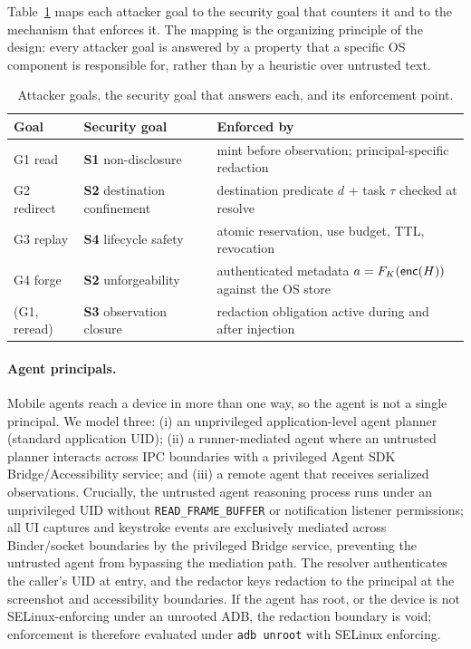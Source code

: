 Table~\ref{tab:goals} maps each attacker goal to the security goal that counters it and to the mechanism that enforces it. The mapping is the organizing principle of the design: every attacker goal is answered by a property that a specific OS component is responsible for, rather than by a heuristic over untrusted text.

\begin{table}[t]
\centering
\caption{Attacker goals, the security goal that answers each, and its enforcement point.}
\label{tab:goals}
\footnotesize
\renewcommand{\arraystretch}{1.08}
\begin{tabularx}{\columnwidth}{@{}>{\raggedright\arraybackslash}p{1.35cm}>{\raggedright\arraybackslash}p{2.15cm}>{\raggedright\arraybackslash}X@{}}
\toprule
Goal & Security goal & Enforced by \\
\midrule
G1 read & \textbf{S1} non-disclosure & mint before observation; principal-specific redaction \\
G2 redirect & \textbf{S2} destination confinement & destination predicate $d$ + task $\tau$ checked at resolve \\
G3 replay & \textbf{S4} lifecycle safety & atomic reservation, use budget, TTL, revocation \\
G4 forge & \textbf{S2} unforgeability & authenticated metadata $a=F_K(\mathsf{enc}(H))$ against the OS store \\
(G1, reread) & \textbf{S3} observation closure & redaction obligation active during and after injection \\
\bottomrule
\end{tabularx}
\end{table}

\paragraph{Agent principals.} Mobile agents reach a device in more than one way, so the agent is not a single principal. We model three: (i) an unprivileged application-level agent planner (standard application UID); (ii) a runner-mediated agent where an untrusted planner interacts across IPC boundaries with a privileged Agent SDK Bridge/Accessibility service; and (iii) a remote agent that receives serialized observations. Crucially, the untrusted agent reasoning process runs under an unprivileged UID without \texttt{READ\_FRAME\_BUFFER} or notification listener permissions; all UI captures and keystroke events are exclusively mediated across Binder/socket boundaries by the privileged Bridge service, preventing the untrusted agent from bypassing the mediation path. The resolver authenticates the caller's UID at entry, and the redactor keys redaction to the principal at the screenshot and accessibility boundaries. If the agent has root, or the device is not SELinux-enforcing under an unrooted ADB, the redaction boundary is void; enforcement is therefore evaluated under \texttt{adb unroot} with SELinux enforcing.

